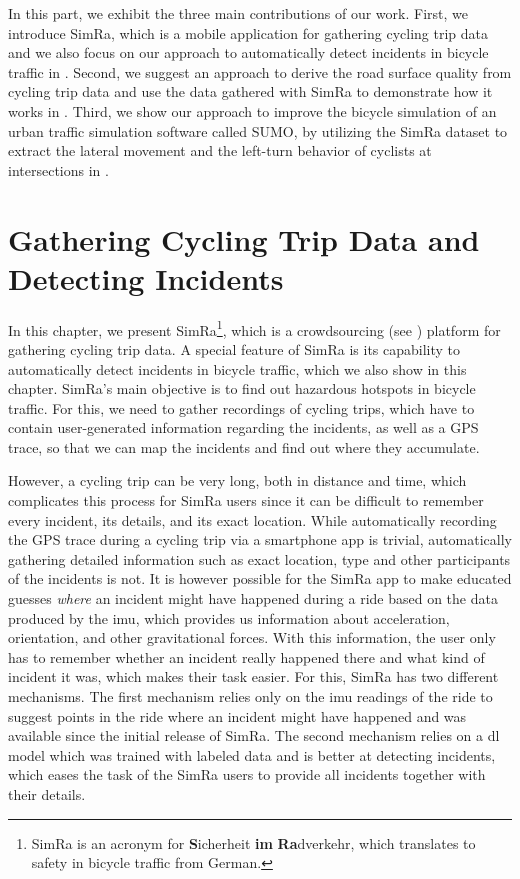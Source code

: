 \vspace*{\fill}
In this part, we exhibit the three main contributions of our work.
First, we introduce SimRa, which is a mobile application for gathering cycling trip data and we also focus on our approach to automatically detect incidents in bicycle traffic in .
Second, we suggest an approach to derive the road surface quality from cycling trip data and use the data gathered with SimRa to demonstrate how it works in .
Third, we show our approach to improve the bicycle simulation of an urban traffic simulation software called SUMO, by utilizing the SimRa dataset to extract the lateral movement and the left-turn behavior of cyclists at intersections in .
\vspace*{\fill}
\chapter{Gathering Cycling Trip Data and Detecting Incidents}
\label{cha:cyclesense}
In this chapter, we present SimRa\footnote{SimRa is an acronym for \textbf{S}icherheit \textbf{im} \textbf{Ra}dverkehr, which translates to safety in bicycle traffic from German.}, which is a crowdsourcing (see ) platform for gathering cycling trip data.
A special feature of SimRa is its capability to automatically detect incidents in bicycle traffic, which we also show in this chapter.
SimRa's main objective is to find out hazardous hotspots in bicycle traffic.
For this, we need to gather recordings of cycling trips, which have to contain user-generated information regarding the incidents, as well as a GPS trace, so that we can map the incidents and find out where they accumulate.

However, a cycling trip can be very long, both in distance and time, which complicates this process for SimRa users since it can be difficult to remember every incident, its details, and its exact location.
While automatically recording the GPS trace during a cycling trip via a smartphone app is trivial, automatically gathering detailed information such as exact location, type and other participants of the incidents is not.
It is however possible for the SimRa app to make educated guesses \textit{where} an incident might have happened during a ride based on the data produced by the \ac{imu}, which provides us information about acceleration, orientation, and other gravitational forces.
With this information, the user only has to remember whether an incident really happened there and what kind of incident it was, which makes their task easier.
For this, SimRa has two different mechanisms.
The first mechanism relies only on the \ac{imu} readings of the ride to suggest points in the ride where an incident might have happened and was available since the initial release of SimRa.
The second mechanism relies on a \ac{dl} model which was trained with labeled data and is better at detecting incidents, which eases the task of the SimRa users to provide all incidents together with their details.

